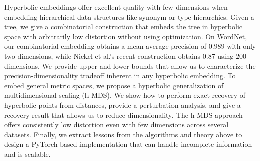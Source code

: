 Hyperbolic embeddings offer excellent quality with few dimensions when embedding hierarchical data structures like synonym or type hierarchies. Given a tree, we give a combinatorial construction that embeds the tree in hyperbolic space with arbitrarily low distortion without using optimization. On WordNet, our combinatorial embedding obtains a mean-average-precision of $0.989$ with only two dimensions, while Nickel et al.'s recent construction obtains $0.87$ using $200$ dimensions.  We provide upper and lower bounds that allow us to characterize the precision-dimensionality tradeoff inherent in any hyperbolic embedding. To embed general metric spaces, we propose a hyperbolic generalization of multidimensional scaling (h-MDS). We show how to perform exact recovery of hyperbolic points from distances, provide a perturbation analysis, and give a recovery result that allows us to reduce dimensionality. The h-MDS approach offers consistently low distortion even with few dimensions across several datasets. Finally, we extract lessons from the algorithms and theory above to design a PyTorch-based implementation that can handle incomplete information and is scalable.
